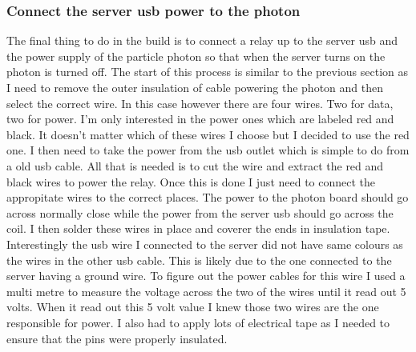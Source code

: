 \documentclass{article}
\begin{document}
\subsubsection{Connect the server usb power to the photon}
The final thing to do in the build is to connect a relay up to the server usb and the power supply of
the particle photon so that when the server turns on the photon is turned off. The start of this process
is similar to the previous section as I need to remove the outer insulation of cable powering the photon
and then select the correct wire. In this case however there are four wires. Two for data, two for power.
I'm only interested in the power ones which are labeled red and black. It doesn't matter which of these
wires I choose but I decided to use the red one. I then need to take the power from the usb outlet which
is simple to do from a old usb cable. All that is needed is to cut the wire and extract the red and black
wires to power the relay. Once this is done I just need to connect the appropitate wires to the correct
places. The power to the photon board should go across normally close while the power from the server
usb should go across the coil. I then solder these wires in place and coverer the ends in insulation
tape. Interestingly the usb wire I connected to the server did not have same colours as the wires
in the other usb cable. This is likely due to the one connected to the server having a ground
wire. To figure out the power cables for this wire I used a multi metre to measure the voltage across
the two of the wires until it read out 5 volts. When it read out this 5 volt value I knew those two
wires are the one responsible for power. I also had to apply lots of electrical tape as I needed to
ensure that the pins were properly insulated.
\end{document}
